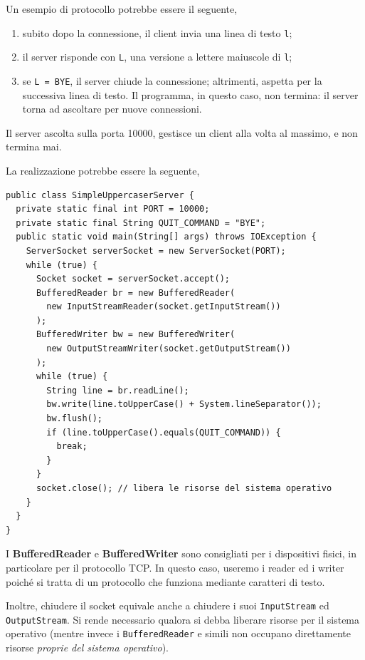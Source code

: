 \documentclass[\fontsizeclass,twocolumn]{\classname}
\theoremstyle{definition}
\theoremstyle{definition}
\begin{document}
Un esempio di protocollo potrebbe essere il seguente,

\begin{enumerate}
    \item subito dopo la connessione, il client invia una linea di testo
        \texttt{l};
    \item il server risponde con \texttt{L}, una versione a lettere maiuscole
        di \texttt{l};
    \item se \texttt{L = BYE}, il server chiude la connessione; altrimenti,
        aspetta per la successiva linea di testo. Il programma, in questo caso,
        non termina: il server torna ad ascoltare per nuove connessioni.
\end{enumerate}

Il server ascolta sulla porta 10000, gestisce un client alla volta al massimo,
e non termina mai.

La realizzazione potrebbe essere la seguente,

\begin{lstlisting}
public class SimpleUppercaserServer {
  private static final int PORT = 10000;
  private static final String QUIT_COMMAND = "BYE";
  public static void main(String[] args) throws IOException {
    ServerSocket serverSocket = new ServerSocket(PORT);
    while (true) {
      Socket socket = serverSocket.accept();
      BufferedReader br = new BufferedReader(
        new InputStreamReader(socket.getInputStream())
      );
      BufferedWriter bw = new BufferedWriter(
        new OutputStreamWriter(socket.getOutputStream())
      );
      while (true) {
        String line = br.readLine();
        bw.write(line.toUpperCase() + System.lineSeparator());
        bw.flush();
        if (line.toUpperCase().equals(QUIT_COMMAND)) {          
          break;
        }
      }
      socket.close(); // libera le risorse del sistema operativo
    }
  }
}
\end{lstlisting}

I \textbf{BufferedReader} e \textbf{BufferedWriter} sono consigliati per i
dispositivi fisici, in particolare per il protocollo TCP. In questo caso,
useremo i reader ed i writer poiché si tratta di un protocollo che funziona
mediante caratteri di testo.

Inoltre, chiudere il socket equivale anche a chiudere i suoi
\texttt{Input\-Stream} ed \texttt{Output\-Stream}. Si rende necessario qualora si
debba liberare risorse per il sistema operativo (mentre invece i
\texttt{BufferedReader} e simili non occupano direttamente risorse
\emph{proprie del sistema operativo}).
\end{document}

